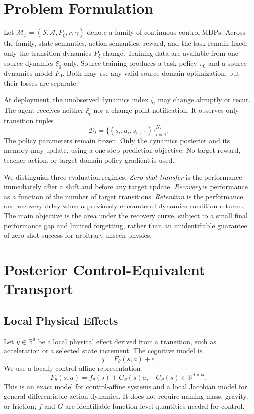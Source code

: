 \documentclass[letterpaper]{article}
\begin{document}
\section{Problem Formulation}

Let $\mathcal{M}_{\xi}=(\mathcal{S},\mathcal{A},P_{\xi},r,\gamma)$ denote a
family of continuous-control MDPs.  Across the family, state semantics, action
semantics, reward, and the task remain fixed; only the transition dynamics
$P_{\xi}$ change.  Training data are available from one source dynamics
$\xi_0$ only.  Source training produces a task policy $\pi_0$ and a source
dynamics model $F_0$.  Both may use any valid source-domain optimization, but
their losses are separate.

At deployment, the unobserved dynamics index $\xi_t$ may change abruptly or
recur.  The agent receives neither $\xi_t$ nor a change-point notification.  It
observes only transition tuples
\begin{equation}
\mathcal{D}_t=\{(s_i,a_i,s_{i+1})\}_{i=1}^{N_t}.
\end{equation}
The policy parameters remain frozen.  Only the dynamics posterior and its
memory may update, using a one-step prediction objective.  No target reward,
teacher action, or target-domain policy gradient is used.

We distinguish three evaluation regimes.  \emph{Zero-shot transfer} is the
performance immediately after a shift and before any target update.
\emph{Recovery} is performance as a function of the number of target
transitions.  \emph{Retention} is the performance and recovery delay when a
previously encountered dynamics condition returns.  The main objective is the
area under the recovery curve, subject to a small final performance gap and
limited forgetting, rather than an unidentifiable guarantee of zero-shot
success for arbitrary unseen physics.

\section{Posterior Control-Equivalent Transport}

\subsection{Local Physical Effects}

Let $y\in\mathbb{R}^{d}$ be a local physical effect derived from a transition,
such as acceleration or a selected state increment.  The cognitive model is
\begin{equation}
y=F_{\theta}(s,a)+\epsilon.
\end{equation}
We use a locally control-affine representation
\begin{equation}
F_{\theta}(s,a)=f_{\theta}(s)+G_{\theta}(s)a,
\quad G_{\theta}(s)\in\mathbb{R}^{d\times m}.
\label{eq:affine}
\end{equation}
This is an exact model for control-affine systems and a local Jacobian model for
general differentiable action dynamics.  It does not require naming mass,
gravity, or friction; $f$ and $G$ are identifiable function-level quantities
needed for control.
\end{document}
